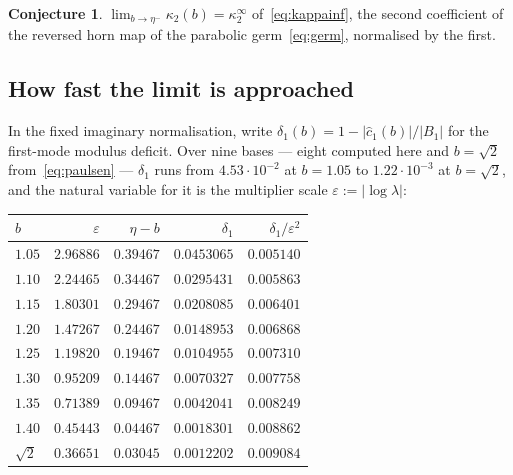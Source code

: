 \documentclass[11pt,a4paper]{article}
\theoremstyle{definition}
\newtheorem{conjecture}[theorem]{Conjecture}
\newcommand{\chat}{\hat{c}_1}
\begin{document}
\begin{conjecture}\label{conj:horn2}
$\displaystyle\lim_{b\to\eta^{-}}\kappa_2(b)=\kappa_2^{\infty}$
of~\eqref{eq:kappainf}, the second coefficient of the reversed horn map of the
parabolic germ~\eqref{eq:germ}, normalised by the first.
\end{conjecture}

\subsection{How fast the limit is approached}\label{sec:deficit}

In the fixed imaginary normalisation, write
$\delta_1(b)=1-|\chat(b)|/|B_1|$ for the first-mode modulus deficit.
Over nine bases --- eight computed here and $b=\sqrt2$
from~\eqref{eq:paulsen} --- $\delta_1$ runs from $4.53\cdot10^{-2}$ at $b=1.05$
to $1.22\cdot10^{-3}$ at $b=\sqrt2$, and the natural variable for it is the multiplier scale
$\varepsilon:=|\log\lambda|$:

\begin{center}
\begin{tabular}{lrrrr}
\toprule
$b$ & $\varepsilon$ & $\eta-b$ & $\delta_1$ & $\delta_1/\varepsilon^{2}$\\
\midrule
$1.05$ & $2.96886$ & $0.39467$ & $0.0453065$ & $0.005140$\\
$1.10$ & $2.24465$ & $0.34467$ & $0.0295431$ & $0.005863$\\
$1.15$ & $1.80301$ & $0.29467$ & $0.0208085$ & $0.006401$\\
$1.20$ & $1.47267$ & $0.24467$ & $0.0148953$ & $0.006868$\\
$1.25$ & $1.19820$ & $0.19467$ & $0.0104955$ & $0.007310$\\
$1.30$ & $0.95209$ & $0.14467$ & $0.0070327$ & $0.007758$\\
$1.35$ & $0.71389$ & $0.09467$ & $0.0042041$ & $0.008249$\\
$1.40$ & $0.45443$ & $0.04467$ & $0.0018301$ & $0.008862$\\
$\sqrt2$ & $0.36651$ & $0.03045$ & $0.0012202$ & $0.009084$\\
\bottomrule
\end{tabular}
\end{center}
\end{document}
